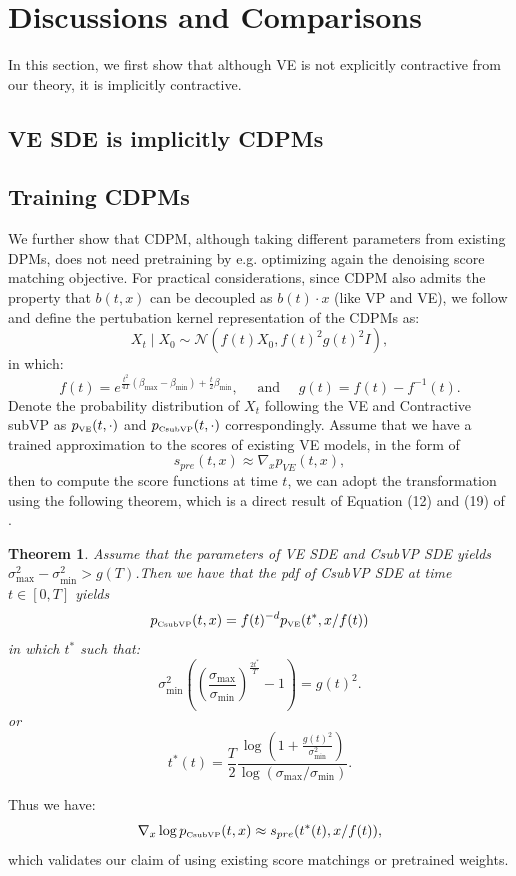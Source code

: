\documentclass[letterpaper,11pt,reqno]{amsart}
\newtheorem{theorem}{Theorem}[section]
\numberwithin{equation}{section}
\begin{document}
\section{Discussions and Comparisons}
In this section, we first show that although VE is not explicitly contractive from our theory, it is implicitly contractive.
\subsection{VE SDE is implicitly CDPMs}

\subsection{Training CDPMs}
We further show that CDPM, although taking different parameters from existing DPMs, does not need pretraining by e.g. optimizing again the denoising score matching objective. For practical considerations, since CDPM also admits the property that $b(t,x)$ can be decoupled as $b(t)\cdot x$ (like VP and VE), we follow \cite{karras2022elucidating} and define the pertubation kernel representation of the CDPMs as:
$$
X_t \mid X_0\sim \mathcal{N}\left(f(t) X_0, f(t)^2 g(t)^2 I\right),
$$
in which:
$$
f(t)=e^{\frac{t^2}{4T}(\beta_{\max} - \beta_{\min}) + \frac{t}{2} \beta_{\min}}, \quad \text { and } \quad g(t)=f(t)-f^{-1}(t).
$$
Denote the probability distribution of $X_t$ following the VE and Contractive subVP as $p_{\tiny \mbox{VE}}(t,\cdot)$ and $p_{\tiny \mbox{CsubVP}}(t,\cdot)$ correspondingly. Assume that we have a trained approximation to the scores of existing VE models, in the form of 
$$
s_{pre}(t,x)\approx \nabla_x p_{VE}(t,x),
$$
then to compute the score functions at time $t$, we can adopt the transformation using the following theorem, which is a direct result of Equation (12) and (19) of \cite{karras2022elucidating}.

\begin{theorem}
Assume that the parameters of VE SDE and CsubVP SDE yields $\sigma^2_{\max}-\sigma^2_{\min}>g(T)$.Then we have that the pdf of CsubVP SDE at time $t\in [0,T]$ yields
\begin{equation}
p_{\tiny \mbox{CsubVP}}(t,x) = f(t)^{-d} p_{\tiny \mbox{VE}}(t^*,x/f(t))
\end{equation}
in which $t^*$ such that:
\begin{equation}
\sigma^2_{\min}\left( \left(\frac{\sigma_{\max}}{\sigma_{\min}} \right)^{\frac{2t^*}{T}}- 1 \right) = g(t)^2.
\end{equation}
or
\begin{equation}
t^*(t)=\frac{T}{2}\frac{\log(1+\frac{g(t)^2}{\sigma^2_{\min}})}{\log(\sigma_{\max}/\sigma_{\min})}.
\end{equation}
\end{theorem}
Thus we have: 
$$\nabla_x\log p_{\tiny \mbox{CsubVP}}(t,x)\approx s_{pre}(t^*(t),x/f(t)),$$
which validates our claim of using existing score matchings or pretrained weights.
\end{document}
